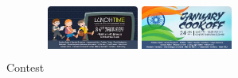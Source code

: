 \documentclass{beamer}
\begin{document}
\begin{frame}
\begin{block}{Contest}
	\href{https://www.codechef.com/LTIME32}	{\includegraphics[width=3cm,height=3cm,keepaspectratio]{images/contests/lunch_time}}
	\href{https://www.codechef.com/COOK66}{\includegraphics[width=3cm,height=3cm,keepaspectratio]{images/contests/cook_off}}
	\end{block}

\end{frame}

\end{document}
